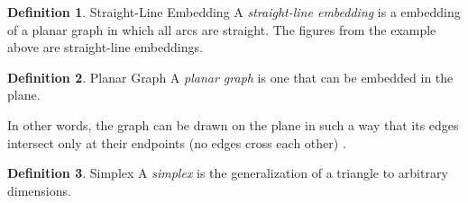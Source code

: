 \documentclass[11pt]{article}
\theoremstyle{definition}
\newtheorem{definition}{Definition}[section]
\begin{document}
	\theoremstyle{definition}
	\begin{definition}{Straight-Line Embedding}
		A \emph{straight-line embedding} is a embedding of a planar graph in which all arcs are straight. The figures from the example above are straight-line embeddings.
  	\end{definition}
	
	\theoremstyle{definition}
	\begin{definition}{Planar Graph}
		A \emph{planar graph} is one that can be embedded in the plane.
	\end{definition}
	
	In other words, the graph can be drawn on the plane in such a way that its edges intersect only at their endpoints (no edges cross each other) \cite{mathworld:PlanarGraph}.
	
	\theoremstyle{definition}
	\begin{definition}{Simplex}
		A \emph{simplex} is the generalization of a triangle to arbitrary dimensions.
	\end{definition}
	
	


\end{document}
